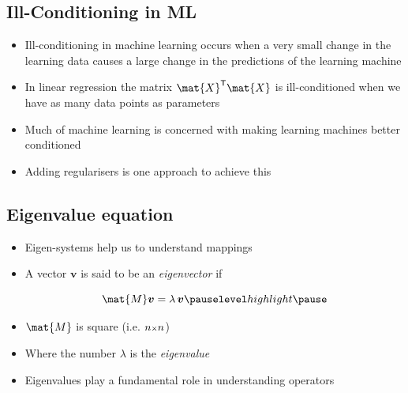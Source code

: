\documentclass[25pt,landscape,footrule]{foils}
\begin{document}
\begin{slide}
\section{Ill-Conditioning in ML}

\begin{PauseHighLight}
  \begin{itemize}
  \item Ill-conditioning in machine learning occurs when a very small
    change in the learning data causes a large change in the predictions
    of the learning machine\pause
  \item In linear regression the matrix $\mat{X}^\tr\mat{X}$ is
    ill-conditioned when we have as many data points as parameters\pause
  \item Much of machine learning is concerned with making learning
    machines better conditioned\pause
  \item Adding regularisers is one approach to achieve this\pause
  \end{itemize}
\end{PauseHighLight}

\end{slide}

\Outline %

\begin{slide}
\section{Eigenvalue equation}


  \begin{itemize}
  \item Eigen-systems help us to understand mappings\pauseh
  \item A vector $\bm{v}$ is said to be an \emph{eigenvector} if
    \begin{minipage}{0.5\linewidth}
      \begin{displaymath}
        \mat{M} \bm{v} = \lambda \, \bm{v}\pauseh
      \end{displaymath}
    \end{minipage}\hfill
    \begin{minipage}{0.3\linewidth}
    \end{minipage}
  \item $\mat{M}$ is square (i.e. $n{\scriptstyle \times} n$)\pause
  \item Where the number $\lambda$ is the \emph{eigenvalue}\pause
  \item Eigenvalues play a fundamental role in understanding operators\pause
  \end{itemize}


\end{slide}
\end{document}
